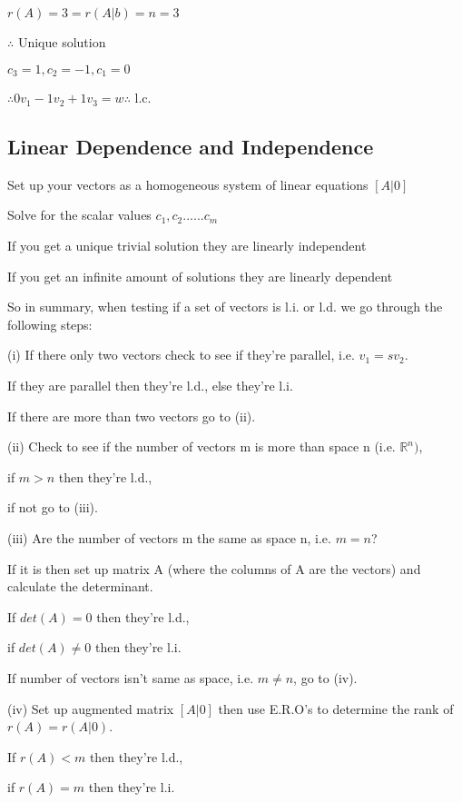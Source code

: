 \documentclass{extarticle}
\begin{document}
$r(A)=3=r(A|b)=n=3$

$\therefore$ Unique solution

$c_3=1,c_2=-1,c_1=0$

$\therefore 0v_1-1v_2+1v_3=w \therefore$ l.c.







\subsection{Linear Dependence and Independence}
Set up your vectors as a homogeneous system of linear equations $[A|0]$

Solve for the scalar values $c_1, c_2...... c_m$

If you get a unique trivial solution they are linearly independent

If you get an infinite amount of solutions they are linearly dependent

\begin{tcolorbox}[enhanced jigsaw,sharp corners,coltext=black,colback=Green!25!white,boxrule=0pt,breakable,size=minimal]
So in summary, when testing if a set of vectors is l.i. or l.d. we go through the following steps:

(i) If there only two vectors check to see if they're parallel, i.e. $v_1 = sv_2$.

If they are parallel then they're l.d., else they're l.i.

If there are more than two vectors go to (ii).

(ii) Check to see if the number of vectors m is more than space n (i.e. ${\mathbb{R}}^n)$, 

if $m > n$ then they're l.d.,

if not go to (iii).

(iii) Are the number of vectors m the same as space n, i.e. $m = n$?

If it is then set up matrix A (where the columns of A are the vectors) and calculate the determinant.

If $det (A) = 0$ then they're l.d.,

if $det (A) \ne 0$ then they're l.i.

If number of vectors isn't same as space, i.e. $m \ne n$, go to (iv).

(iv) Set up augmented matrix $[A|0]$ then use E.R.O's to determine the rank of $r(A) =
r(A|0)$.

If $r(A) < m$ then they're l.d.,

if $r(A) = m$ then they're l.i.
\end{tcolorbox}
\end{document}
